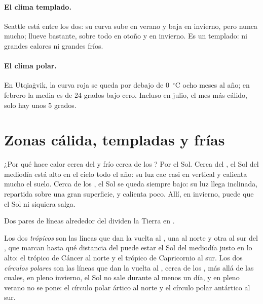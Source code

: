 \paragraph{El clima templado.} Seattle está entre los dos: su curva sube en
verano y baja en invierno, pero nunca mucho; llueve bastante, sobre todo en
otoño y en invierno. Es un  templado: ni grandes calores ni grandes
fríos.

\paragraph{El clima polar.} En Utqiaġvik, la curva roja se queda por debajo
de 0~$^\circ$C ocho meses al año; en febrero la media es de 24 grados bajo
cero. Incluso en julio, el mes más cálido, solo hay unos 5 grados.

\section{Zonas cálida, templadas y frías}

¿Por qué hace calor cerca del  y frío cerca de los ? Por el
Sol. Cerca del , el Sol del mediodía está alto en el cielo todo el
año: su luz cae casi en vertical y calienta mucho el suelo. Cerca de los
, el Sol se queda siempre bajo: su luz llega inclinada, repartida
sobre una gran superficie, y calienta poco. Allí, en invierno, puede que el
Sol ni siquiera salga.

Dos pares de líneas alrededor del  dividen la Tierra en .

\begin{definition}\label{def:g5:weather-and-climate:tropics}
Los dos \emph{trópicos} son las líneas que dan la
vuelta al , una al norte y otra al sur del , que marcan hasta
qué distancia del  puede estar el Sol del mediodía justo en lo alto:
el trópico de Cáncer al norte y el trópico de Capricornio al sur. Los dos
\emph{círculos polares} son las líneas
que dan la vuelta al , cerca de los , más allá de las cuales, en
pleno invierno, el Sol no sale durante al menos un día, y en pleno verano
no se pone: el círculo polar ártico al norte y el círculo polar antártico
al sur.
\end{definition}

